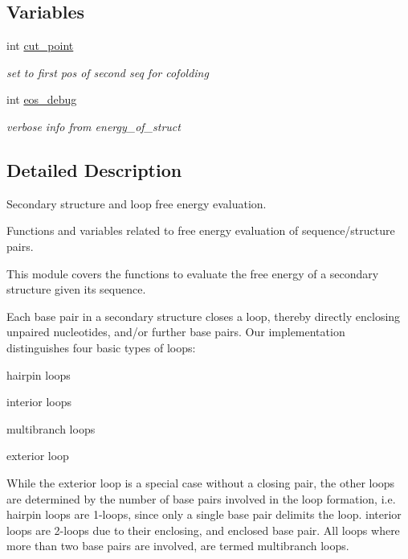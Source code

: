 \subsection*{Variables}
\begin{DoxyCompactItemize}
\item 
\mbox{\label{group__eval_gab9b2c3a37a5516614c06d0ab54b97cda}} 
int \hyperlink{group__eval_gab9b2c3a37a5516614c06d0ab54b97cda}{cut\+\_\+point}
\begin{DoxyCompactList}\small\item\em set to first pos of second seq for cofolding \end{DoxyCompactList}\item 
\mbox{\label{group__eval_ga567530678f6260a1a649a5beca5da4c5}} 
int \hyperlink{group__eval_ga567530678f6260a1a649a5beca5da4c5}{eos\+\_\+debug}
\begin{DoxyCompactList}\small\item\em verbose info from energy\+\_\+of\+\_\+struct \end{DoxyCompactList}\end{DoxyCompactItemize}


\subsection{Detailed Description}
Secondary structure and loop free energy evaluation. 

Functions and variables related to free energy evaluation of sequence/structure pairs.

This module covers the functions to evaluate the free energy of a secondary structure given its sequence.

Each base pair in a secondary structure closes a loop, thereby directly enclosing unpaired nucleotides, and/or further base pairs. Our implementation distinguishes four basic types of loops\+:


\begin{DoxyItemize}
\item hairpin loops
\item interior loops
\item multibranch loops
\item exterior loop
\end{DoxyItemize}

While the exterior loop is a special case without a closing pair, the other loops are determined by the number of base pairs involved in the loop formation, i.\+e. hairpin loops are 1-\/loops, since only a single base pair delimits the loop. interior loops are 2-\/loops due to their enclosing, and enclosed base pair. All loops where more than two base pairs are involved, are termed multibranch loops.

